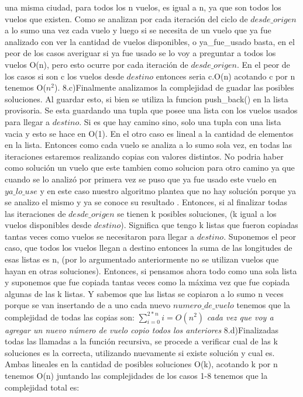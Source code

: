 \documentclass[a4paper]{article}
\begin{document}
una misma ciudad, para todos los n vuelos, es igual a n, ya que son todos los vuelos que existen. Como se analizan por cada iteración del ciclo de $desde\_origen$ a lo sumo una vez cada vuelo y luego si se necesita de un vuelo que ya fue analizado con ver la cantidad de vuelos disponibles, o ya\_fue\_usado basta, en el peor de los casos averiguar si ya fue usado se lo voy a preguntar a todos los vuelos O(n), pero esto ocurre por cada iteración de $desde\_origen$. En el peor de los casos si son c los vuelos desde $destino$ entonces seria c.O(n) acotando c por n tenemos O($n^{2}$). \newline
8.c)Finalmente analizamos la complejidad de guadar las posibles soluciones. Al guardar esto, si bien se utiliza la funcion push\_back() en la lista provisoria. Se esta guardando una tupla que posee una lista con los vuelos usados para llegar a $destino$. Si es que hay camino sino, solo una tupla con una lista vacia y esto se hace en O(1). En el otro caso es lineal a la cantidad de elementos en la lista. Entonces como cada vuelo se analiza a lo sumo sola vez, en todas las iteraciones estaremos realizando copias con valores distintos. No podria haber como solución un vuelo que este tambien como solucion para otro camino ya que cuando se lo analizó por primera vez se puso que ya fue usado este vuelo en $ya\_lo\_use$ y en este caso nuestro algoritmo plantea que no hay solución porque ya se analizo el mismo y ya se conoce su resultado . Entonces, si al finalizar todas las iteraciones de $desde\_origen$ se tienen k posibles soluciones, (k igual a los vuelos disponibles desde $destino$). Significa que tengo k listas que fueron copiadas tantas veces como vuelos se necesitaron para llegar a $destino$. Suponemos el peor caso, que todos los vuelos llegan a destino entonces la suma de las longitudes de esas listas es n, (por lo argumentado anteriormente no se utilizan vuelos que hayan en otras soluciones). Entonces, si pensamos ahora todo como una sola lista y suponemos que fue copiada tantas veces como la máxima vez que fue copiada algunas de las k listas. Y sabemos que las listas se copiaron a lo sumo n veces porque se van insertando de a uno cada nuevo $numero\_de\_vuelo$ 
tenemos que la complejidad de todas las copias son:\newline
$\sum_{i=0}^{2*n}{i}= O(n^{2})$\newline
\textit{cada vez que voy a agregar un nuevo número de vuelo copio todos los anteriores}\newline
8.d)Finalizadas todas las llamadas a la función recursiva, se procede a verificar cual de las k soluciones es la correcta, utilizando nuevamente si existe solución y cual es. Ambas lineales en la cantidad de posibles soluciones O(k), acotando k por n tenemos O(n)\newline
juntando las complejidades de los casos 1-8 tenemos que la complejidad total es:     
\end{document}
